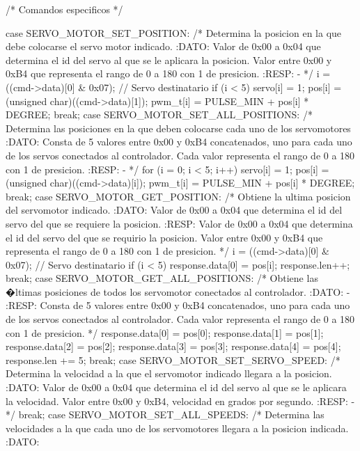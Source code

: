 {\begin{verbatimtab}
{{		/* Comandos especificos */
		
 		case SERVO_MOTOR_SET_POSITION:
			/* Determina la posicion en la que debe colocarse el 
			servo motor indicado.
			:DATO:
			Valor de 0x00 a 0x04 que determina el id del servo al
			que se le aplicara la posicion. Valor entre 0x00 y 0xB4
			que representa el rango de 0 a 180 con 1 de presicion.
			:RESP:
			-
			*/
			i = ((cmd->data)[0] & 0x07); // Servo destinatario
			if (i < 5)
			{
				servo[i] = 1;
				pos[i] = (unsigned char)((cmd->data)[1]);
				pwm_t[i] = PULSE_MIN + pos[i] * DEGREE;
			}	
		break;
 		case SERVO_MOTOR_SET_ALL_POSITIONS:
			/* Determina las posiciones en la que deben colocarse
			cada uno de los servomotores
			:DATO:
			Consta de 5 valores entre 0x00 y 0xB4 concatenados, uno
			para cada uno de los servos conectados al controlador.
			Cada valor representa el rango de 0 a 180 con 1 de presicion.
			:RESP:
			-
			*/
			for (i = 0; i < 5; i++)
			{
				servo[i] = 1;
				pos[i] = (unsigned char)((cmd->data)[i]);
				pwm_t[i] = PULSE_MIN + pos[i] * DEGREE;
			}	
		break;
 		case SERVO_MOTOR_GET_POSITION:
			/* Obtiene la ultima posicion del servomotor indicado.
			:DATO:
			Valor de 0x00 a 0x04 que determina el id del servo del que
			se requiere la posicion.
			:RESP:
			Valor de 0x00 a 0x04 que determina el id del servo del que 
			se requirio la posicion. Valor entre 0x00 y 0xB4 que representa
			el rango de 0 a 180 con 1 de presicion.
			*/
			i = ((cmd->data)[0] & 0x07); // Servo destinatario
			if (i < 5)
			{
				response.data[0] = pos[i];
				response.len++;
			}	
		break;
 		case SERVO_MOTOR_GET_ALL_POSITIONS:
			/* Obtiene las �ltimas posiciones de todos los servomotor
			conectados al controlador.
			:DATO:
			-
			:RESP:
			Consta de 5 valores entre 0x00 y 0xB4 concatenados, uno para 
			cada uno de los servos conectados al controlador. Cada valor 
			representa el rango de 0 a 180 con 1 de presicion.
			*/
			response.data[0] = pos[0];
			response.data[1] = pos[1];
			response.data[2] = pos[2];
			response.data[3] = pos[3];
			response.data[4] = pos[4];
			response.len += 5;
		break;
		case SERVO_MOTOR_SET_SERVO_SPEED:
			/* Determina la velocidad a la que el servomotor indicado 
			llegara a la posicion.
			:DATO:
			Valor de 0x00 a 0x04 que determina el id del servo al que 
			se le aplicara la velocidad. Valor entre 0x00 y 0xB4, 
			velocidad en grados por segundo.
			:RESP:
			-
			*/
		break;
 		case SERVO_MOTOR_SET_ALL_SPEEDS:
			/* Determina las velocidades a la que cada uno de los 
			servomotores llegara a la posicion indicada.
			:DATO:
}}
\end{verbatimtab}}
